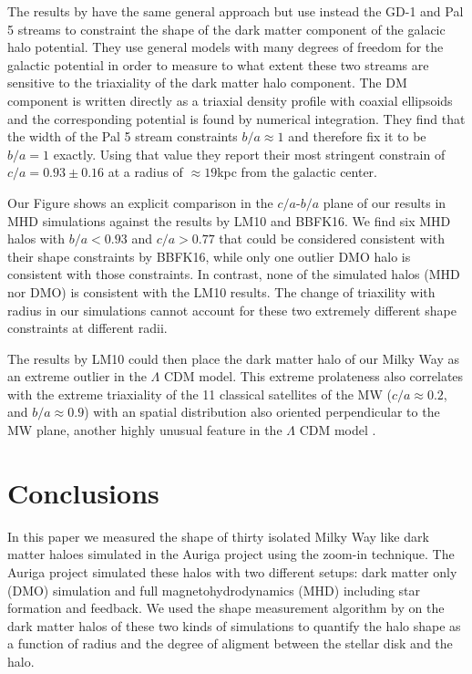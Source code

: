 \documentclass[a4paper,fleqn,usenatbib]{mnras}
\begin{document}
The results by \cite{Bovy16} have the same general approach but use
instead the GD-1 \citep{2006ApJ...641L..37G} and Pal 5 \citep{2009AJ....137.3378O}
streams to constraint the shape of the dark matter component of the
galacic halo potential.
They use general models with many degrees of freedom for the galactic
potential in order to measure to what extent these two streams are sensitive
to the triaxiality of the dark matter halo component.
The DM component is written directly as a triaxial density profile
with coaxial ellipsoids and the corresponding potential is found by
numerical integration.
They find that the width of the Pal 5 stream constraints $b/a\approx
1$ and therefore fix it to be $b/a=1$ exactly.
Using that value they report their most stringent constrain of
$c/a=0.93\pm0.16$ at a radius of $\approx 19$kpc from the galactic
center. 

Our Figure \label{fig:observations} shows an explicit comparison in
the $c/a$-$b/a$ plane of our results in MHD simulations against the
results by LM10 and BBFK16.  
We find six MHD halos with $b/a<0.93$ and $c/a>0.77$ that could be
considered consistent with their shape constraints  by BBFK16, while
only one outlier DMO halo is consistent with those constraints.
In contrast, none of the simulated halos (MHD nor DMO) is consistent
with the LM10 results. 
The change of triaxility with radius in our simulations cannot account
for these two extremely different shape constraints at different
radii. 


The results by LM10 could then place the dark matter halo of our Milky
Way as an extreme outlier in the $\Lambda$ CDM model. 
This extreme prolateness also correlates with the extreme
triaxiality of the 11 classical satellites of the MW ($c/a\approx
0.2$, and $b/a\approx0.9$) with an spatial distribution 
also oriented perpendicular to the MW plane, another highly unusual
feature in the $\Lambda$ CDM model \citep{2018MNRAS.478.5533F}.


\section{Conclusions}
\label{sec:conclusions}

In this paper we measured the shape of thirty isolated Milky Way like 
dark matter haloes simulated in the Auriga project using the zoom-in
technique. 
The Auriga project simulated these halos with two different setups:
dark matter only (DMO) simulation and full magnetohydrodynamics (MHD)
including star formation and feedback.
We used the shape measurement algorithm by \cite{Allgood06} on the
dark matter halos of these two kinds of simulations to quantify the
halo shape as a function of radius and the degree of aligment between
the stellar disk and the halo.
\end{document}
